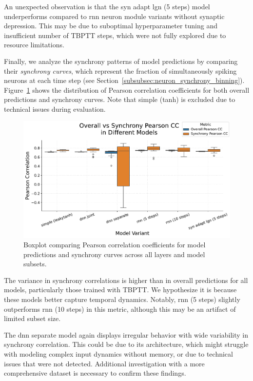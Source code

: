 An unexpected observation is that the syn adapt lgn (5 steps) model underperforms compared to rnn neuron module variants without synaptic depression. This may be due to suboptimal hyperparameter tuning and insufficient number of TBPTT steps, which were not fully explored due to resource limitations.

Finally, we analyze the synchrony patterns of model predictions by comparing their \emph{synchrony curves}, which represent the fraction of simultaneously spiking neurons at each time step (see Section~\ref{subsubsec:neuron_synchrony_binning}). Figure~\ref{fig:boxplot_models_overall_synchrony_pearson_comparison} shows the distribution of Pearson correlation coefficients for both overall predictions and synchrony curves. Note that simple (tanh) is excluded due to technical issues during evaluation.

\begin{figure}
    \centering
    \includegraphics[width=\linewidth]{img/plots/boxplot_model_comparison_synchrony_overall_pearson.pdf}
    \caption{Boxplot comparing Pearson correlation coefficients for model predictions and synchrony curves across all layers and model subsets.}
    \label{fig:boxplot_models_overall_synchrony_pearson_comparison}
\end{figure}

The variance in synchrony correlations is higher than in overall predictions for all models, particularly those trained with TBPTT. We hypothesize it is because these models better capture temporal dynamics. Notably, rnn (5 steps) slightly outperforms rnn (10 steps) in this metric, although this may be an artifact of limited subset size.

The dnn separate model again displays irregular behavior with wide variability in synchrony correlation. This could be due to its architecture, which might struggle with modeling complex input dynamics without memory, or due to technical issues that were not detected. Additional investigation with a more comprehensive dataset is necessary to confirm these findings.

